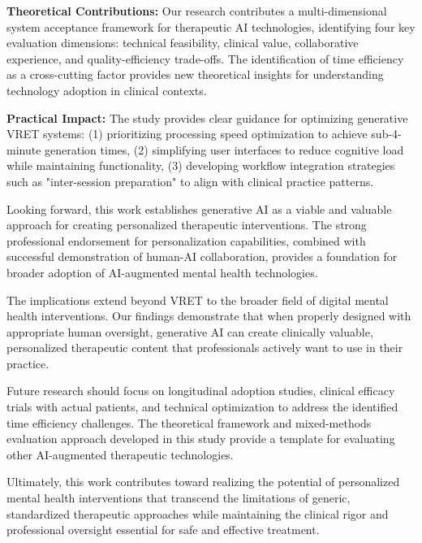 \documentclass[]{interact}
\begin{document}
\textbf{Theoretical Contributions:} Our research contributes a multi-dimensional system acceptance framework for therapeutic AI technologies, identifying four key evaluation dimensions: technical feasibility, clinical value, collaborative experience, and quality-efficiency trade-offs. The identification of time efficiency as a cross-cutting factor provides new theoretical insights for understanding technology adoption in clinical contexts.

\textbf{Practical Impact:} The study provides clear guidance for optimizing generative VRET systems: (1) prioritizing processing speed optimization to achieve sub-4-minute generation times, (2) simplifying user interfaces to reduce cognitive load while maintaining functionality, (3) developing workflow integration strategies such as "inter-session preparation" to align with clinical practice patterns.

Looking forward, this work establishes generative AI as a viable and valuable approach for creating personalized therapeutic interventions. The strong professional endorsement for personalization capabilities, combined with successful demonstration of human-AI collaboration, provides a foundation for broader adoption of AI-augmented mental health technologies.

The implications extend beyond VRET to the broader field of digital mental health interventions. Our findings demonstrate that when properly designed with appropriate human oversight, generative AI can create clinically valuable, personalized therapeutic content that professionals actively want to use in their practice.

Future research should focus on longitudinal adoption studies, clinical efficacy trials with actual patients, and technical optimization to address the identified time efficiency challenges. The theoretical framework and mixed-methods evaluation approach developed in this study provide a template for evaluating other AI-augmented therapeutic technologies.

Ultimately, this work contributes toward realizing the potential of personalized mental health interventions that transcend the limitations of generic, standardized therapeutic approaches while maintaining the clinical rigor and professional oversight essential for safe and effective treatment.


\begingroup
\raggedright

\endgroup
\end{document}
